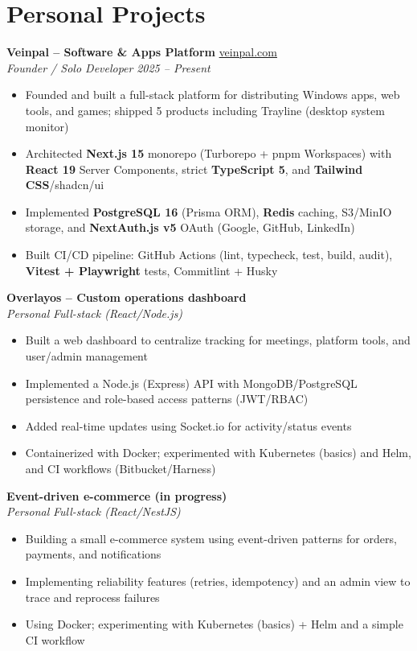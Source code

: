\documentclass[10pt,a4paper]{article}
\begin{document}
\vspace{4pt}
\section*{Personal Projects}
{\small
\textbf{Veinpal -- Software \& Apps Platform} \hfill \href{https://veinpal.com}{veinpal.com}\\[1pt]
\textit{Founder / Solo Developer} \hfill \textit{2025 -- Present}
\begin{itemize}
  \item Founded and built a full-stack platform for distributing Windows apps, web tools, and games; shipped 5 products including Trayline (desktop system monitor)
  \item Architected \textbf{Next.js 15} monorepo (Turborepo + pnpm Workspaces) with \textbf{React 19} Server Components, strict \textbf{TypeScript 5}, and \textbf{Tailwind CSS}/shadcn/ui
  \item Implemented \textbf{PostgreSQL 16} (Prisma ORM), \textbf{Redis} caching, S3/MinIO storage, and \textbf{NextAuth.js v5} OAuth (Google, GitHub, LinkedIn)
  \item Built CI/CD pipeline: GitHub Actions (lint, typecheck, test, build, audit), \textbf{Vitest + Playwright} tests, Commitlint + Husky
\end{itemize}

\vspace{2pt}
\textbf{Overlayos -- Custom operations dashboard}\\[1pt]
\textit{Personal} \hfill \textit{Full-stack (React/Node.js)}
\begin{itemize}
  \item Built a web dashboard to centralize tracking for meetings, platform tools, and user/admin management
  \item Implemented a Node.js (Express) API with MongoDB/PostgreSQL persistence and role-based access patterns (JWT/RBAC)
  \item Added real-time updates using Socket.io for activity/status events
  \item Containerized with Docker; experimented with Kubernetes (basics) and Helm, and CI workflows (Bitbucket/Harness)
\end{itemize}

\vspace{2pt}
\textbf{Event-driven e-commerce (in progress)}\\[1pt]
\textit{Personal} \hfill \textit{Full-stack (React/NestJS)}
\begin{itemize}
  \item Building a small e-commerce system using event-driven patterns for orders, payments, and notifications
  \item Implementing reliability features (retries, idempotency) and an admin view to trace and reprocess failures
  \item Using Docker; experimenting with Kubernetes (basics) + Helm and a simple CI workflow
\end{itemize}
}
\end{document}
